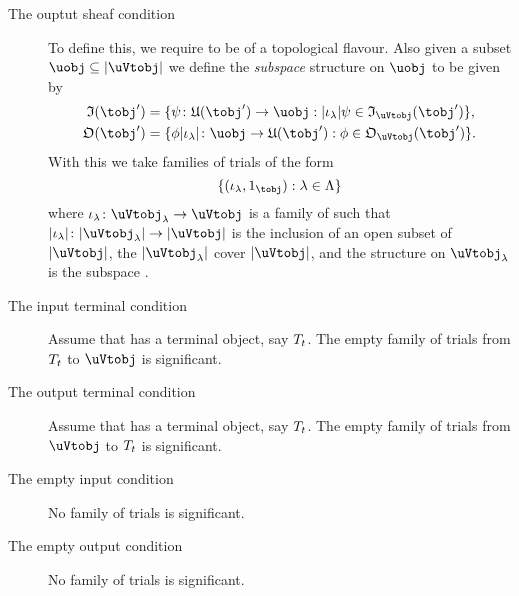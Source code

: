 \documentclass[%
12pt,%
arxiv,%
defaults
]{myclass}
\begin{document}
\begin{defn}
\begin{description}
\item[The ouptut sheaf condition]
To define this, we require \ucat to be of a topological flavour.
Also given a subset \(\uobj \subseteq \forfunc[\uVtobj]\) we define the \emph{subspace} \Vtalgobj structure on \(\uobj\) to be given by
%
\begin{align*}
\itest(\tobj') &= \{\ifn \colon \ufunc(\tobj') \to \uobj : \forfunc[\iota_\lambda]\ifn \in \itest_{\uVtobj}(\tobj')\}, \\
%
\otest(\tobj') &= \{\ofn\forfunc[\iota_\lambda] \colon \uobj \to \ufunc(\tobj') : \ofn \in \otest_{\uVtobj}(\tobj')\}.
%
\end{align*}
%
With this we take families of trials of the form
%
\[
  \{(\iota_\lambda, 1_{\tobj}) : \lambda \in \Lambda\}
\]
%
where \(\iota_\lambda \colon \uVtobj_\lambda \to \uVtobj\) is a family of \uVtmors such that \(\forfunc[\iota_\lambda] \colon \forfunc[\uVtobj_\lambda] \to \forfunc[\uVtobj]\) is the inclusion of an open subset of \(\forfunc[\uVtobj]\), the \(\forfunc[\uVtobj_\lambda]\) cover \(\forfunc[\uVtobj]\), and the \Vtalgobj structure on \(\uVtobj_\lambda\) is the subspace \Vtalgobj.

\item[The input terminal condition]
%
Assume that \tcat has a terminal object, say \(\term{t}\).
The empty family of trials from \(\term{t}\) to \(\uVtobj\) is significant.

\item[The output terminal condition]
%
Assume that \tcat has a terminal object, say \(\term{t}\).
The empty family of trials from \(\uVtobj\) to \(\term{t}\) is significant.


\item[The empty input condition]
%
No family of trials is significant.

\item[The empty output condition]
%
No family of trials is significant.
\end{description}
\end{defn}
\end{document}
